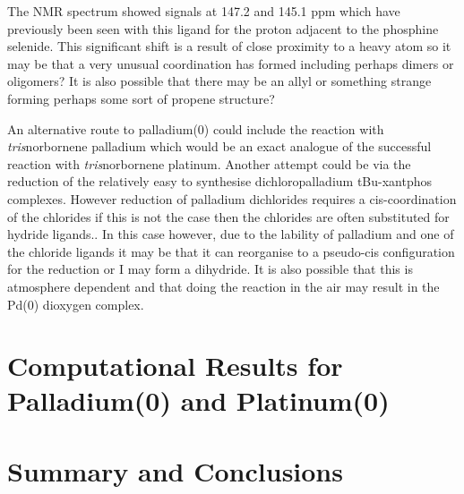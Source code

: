 The \carbon{} NMR spectrum showed signals at 147.2 and 145.1 ppm which have previously been seen with this ligand for the proton adjacent to the phosphine selenide.  This significant shift is a result of close proximity to a heavy atom so it may be that a very unusual coordination has formed including perhaps dimers or oligomers?  It is also possible that there may be an allyl or something strange forming  perhaps some sort of propene structure?

An alternative route to palladium(0) could include the reaction with \emph{tris}norbornene palladium which would be an exact analogue of the successful reaction with \emph{tris}norbornene platinum.  Another attempt could be via the reduction of the relatively easy to synthesise dichloropalladium tBu-xantphos complexes.  However reduction of palladium dichlorides requires a cis-coordination of the chlorides if this is not the case then the chlorides are often substituted for hydride ligands..  In this case however, due to the lability of palladium and one of the chloride ligands it may be that it can reorganise to a pseudo-cis configuration for the reduction or I may form a dihydride.  It is also possible that this is atmosphere dependent and that doing the reaction in the air may result in the Pd(0) dioxygen complex.  




\section{Computational Results for Palladium(0) and Platinum(0)}




\section{Summary and Conclusions}


